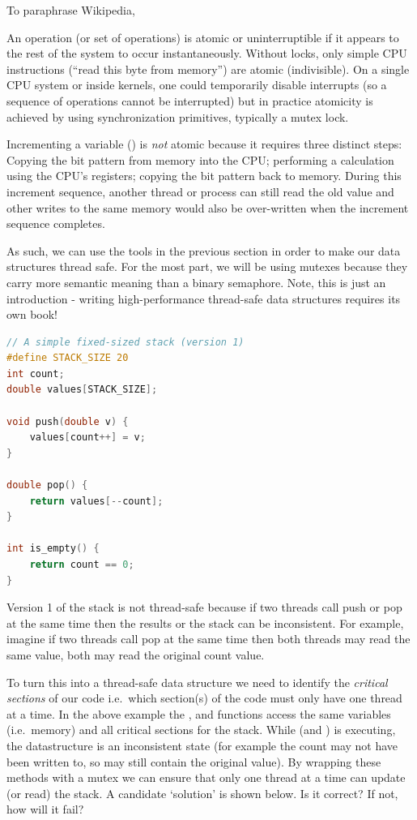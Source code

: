 To paraphrase Wikipedia, 
\begin{displayquote}
An operation (or set of operations) is atomic or uninterruptible if it appears to the rest of the system to occur instantaneously. Without locks, only simple CPU instructions (``read this byte from memory'') are atomic (indivisible). On a single CPU system or inside kernels, one could temporarily disable interrupts (so a sequence of operations cannot be interrupted) but in practice atomicity is achieved by using synchronization primitives, typically a mutex lock.
\end{displayquote}
Incrementing a variable () is \emph{not} atomic because it requires three distinct steps: Copying the bit pattern from memory into the CPU; performing a calculation using the CPU's registers; copying the bit pattern back to memory. During this increment sequence, another thread or process can still read the old value and other writes to the same memory would also be over-written when the increment sequence completes.

As such, we can use the tools in the previous section in order to make our data structures thread safe. For the most part, we will be using mutexes because they carry more semantic meaning than a binary semaphore. Note, this is just an introduction - writing high-performance thread-safe data structures requires its own book!

\begin{lstlisting}[language=C]
// A simple fixed-sized stack (version 1)
#define STACK_SIZE 20
int count;
double values[STACK_SIZE];

void push(double v) { 
    values[count++] = v; 
}

double pop() {
    return values[--count];
}

int is_empty() {
    return count == 0;
}
\end{lstlisting}

Version 1 of the stack is not thread-safe because if two threads call push or pop at the same time then the results or the stack can be inconsistent. For example, imagine if two threads call pop at the same time then both threads may read the same value, both may read the original count value.

To turn this into a thread-safe data structure we need to identify the \emph{critical sections} of our code i.e.~which section(s) of the code must only have one thread at a time. In the above example the , and  functions access the same variables (i.e.~memory) and all critical sections for the stack. While  (and ) is executing, the datastructure is an inconsistent state (for example the count may not have been written to, so may still contain the original value). By wrapping these methods with a mutex we can ensure that only one thread at a time can update (or read) the stack. A candidate `solution' is shown below. Is it correct? If not, how will it fail?

